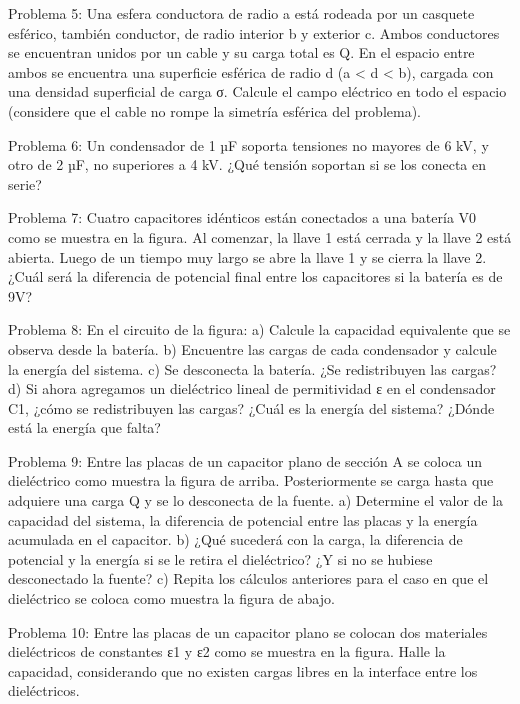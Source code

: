 Problema 5:
Una esfera conductora de radio a está rodeada por un casquete esférico, también conductor, de radio interior b y exterior c. Ambos conductores se encuentran unidos por un cable y su carga total es Q. En el espacio entre ambos se encuentra una superficie esférica de radio d (a < d < b), cargada con una densidad superficial de carga σ. Calcule el campo eléctrico en todo el espacio (considere que el cable no rompe la simetría esférica del problema).



Problema 6:
Un condensador de 1 µF soporta tensiones no mayores de 6 kV, y otro de 2 µF, no superiores a 4 kV. ¿Qué tensión soportan si se los conecta en serie?
 




Problema 7:
Cuatro capacitores idénticos están conectados a una batería V0 como se muestra en la figura. Al comenzar, la llave 1 está cerrada y la llave 2 está abierta. Luego de un tiempo muy largo se abre la llave 1 y se cierra la llave 2. ¿Cuál será la diferencia de potencial final entre los capacitores si la batería es de 9V?




Problema 8:
En el circuito de la figura:
a)	Calcule la capacidad equivalente que se observa desde la batería.
b)	Encuentre  las  cargas  de  cada  condensador  y  calcule  la energía del sistema.
c)	Se desconecta la batería. ¿Se redistribuyen las cargas?
d)	Si ahora agregamos un dieléctrico lineal de permitividad ε en el condensador C1, ¿cómo se redistribuyen las cargas? ¿Cuál es la energía del sistema? ¿Dónde está la energía que falta?



Problema 9:
Entre las placas de un capacitor plano de sección A se coloca un dieléctrico como muestra la figura de arriba. Posteriormente se carga hasta que adquiere una carga Q y se lo desconecta de la fuente.
a)	Determine el valor de la capacidad del sistema, la diferencia de potencial entre las placas y la energía acumulada en el capacitor.
b)	¿Qué sucederá con la carga, la diferencia de potencial y la energía si se le retira el dieléctrico? ¿Y si no se hubiese desconectado la fuente?
c)	Repita los cálculos anteriores para el caso en que el dieléctrico se coloca como muestra la figura de abajo.




Problema 10:
Entre las placas de un capacitor plano se colocan dos materiales dieléctricos de constantes ε1 y ε2  como se muestra en la figura. Halle la capacidad, considerando que no existen cargas libres en la interface entre los dieléctricos.



